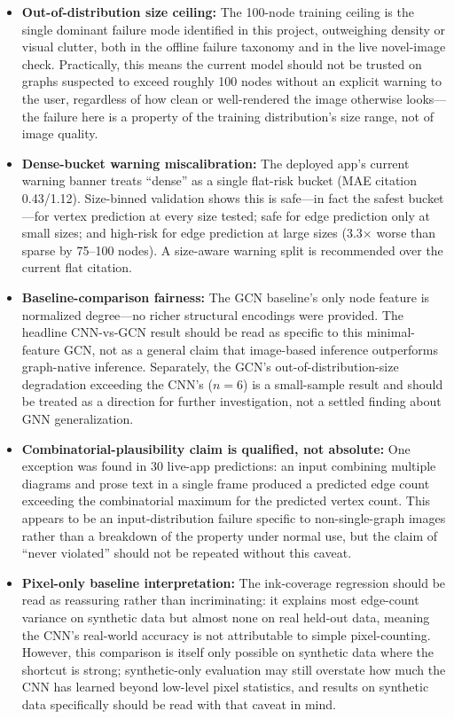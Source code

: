 \documentclass[11pt,letterpaper]{article}
\numberwithin{equation}{section}
\numberwithin{figure}{section}
\numberwithin{table}{section}
\begin{document}
\begin{itemize}
    \item \textbf{Out-of-distribution size ceiling:} The 100-node training ceiling is the single dominant failure mode identified in this project, outweighing density or visual clutter, both in the offline failure taxonomy and in the live novel-image check. Practically, this means the current model should not be trusted on graphs suspected to exceed roughly 100 nodes without an explicit warning to the user, regardless of how clean or well-rendered the image otherwise looks---the failure here is a property of the training distribution's size range, not of image quality.
    \item \textbf{Dense-bucket warning miscalibration:} The deployed app's current warning banner treats ``dense'' as a single flat-risk bucket (MAE citation 0.43/1.12). Size-binned validation shows this is safe---in fact the safest bucket---for vertex prediction at every size tested; safe for edge prediction only at small sizes; and high-risk for edge prediction at large sizes (3.3$\times$ worse than sparse by 75--100 nodes). A size-aware warning split is recommended over the current flat citation.
    \item \textbf{Baseline-comparison fairness:} The GCN baseline's only node feature is normalized degree---no richer structural encodings were provided. The headline CNN-vs-GCN result should be read as specific to this minimal-feature GCN, not as a general claim that image-based inference outperforms graph-native inference. Separately, the GCN's out-of-distribution-size degradation exceeding the CNN's ($n=6$) is a small-sample result and should be treated as a direction for further investigation, not a settled finding about GNN generalization.
    \item \textbf{Combinatorial-plausibility claim is qualified, not absolute:} One exception was found in 30 live-app predictions: an input combining multiple diagrams and prose text in a single frame produced a predicted edge count exceeding the combinatorial maximum for the predicted vertex count. This appears to be an input-distribution failure specific to non-single-graph images rather than a breakdown of the property under normal use, but the claim of ``never violated'' should not be repeated without this caveat.
    \item \textbf{Pixel-only baseline interpretation:} The ink-coverage regression should be read as reassuring rather than incriminating: it explains most edge-count variance on synthetic data but almost none on real held-out data, meaning the CNN's real-world accuracy is not attributable to simple pixel-counting. However, this comparison is itself only possible on synthetic data where the shortcut is strong; synthetic-only evaluation may still overstate how much the CNN has learned beyond low-level pixel statistics, and results on synthetic data specifically should be read with that caveat in mind.

\end{itemize}
\end{document}
